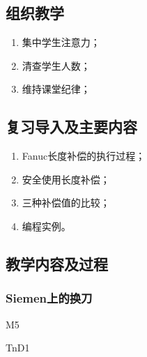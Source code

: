\jxhj{%
	}

\makeshouye %

\subsection{组织教学}
\begin{enumerate}[\hspace{2em}1、]
\item 集中学生注意力；
\item 清查学生人数；
\item 维持课堂纪律；
\end{enumerate}

\subsection{复习导入及主要内容}
\begin{enumerate}[1、]
\item Fanuc长度补偿的执行过程；
\item 安全使用长度补偿；
\item 三种补偿值的比较；
\item 编程实例。
\end{enumerate}

\subsection{教学内容及过程}

\subsubsection{Siemen上的换刀}
M5

TnD1

